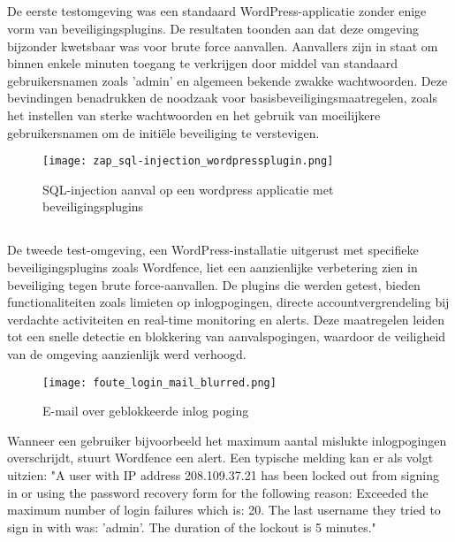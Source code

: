 \subsection{}
De eerste testomgeving was een standaard WordPress-applicatie zonder enige vorm van beveiligingsplugins. De resultaten toonden aan dat deze 
omgeving bijzonder kwetsbaar was voor brute force aanvallen. Aanvallers zijn in staat om binnen enkele minuten toegang te verkrijgen door middel 
van standaard gebruikersnamen zoals 'admin' en algemeen bekende zwakke wachtwoorden. Deze bevindingen benadrukken de noodzaak voor 
basisbeveiligingsmaatregelen, zoals het instellen van sterke wachtwoorden en het gebruik van moeilijkere gebruikersnamen om de initiële 
beveiliging te verstevigen.

\begin{figure}
    \centering
    \texttt{[image: zap\_sql-injection\_wordpressplugin.png]}
    \caption[SQL-injection aanval op een wordpress applicatie met beveiligingsplugins]{SQL-injection aanval op een wordpress applicatie met beveiligingsplugins}
    \label{fig:sql-injection}
\end{figure}
\subsection{}
De tweede test-omgeving, een WordPress-installatie uitgerust met specifieke beveiligingsplugins zoals Wordfence, liet een aanzienlijke 
verbetering zien in beveiliging tegen brute force-aanvallen. De plugins die werden getest, bieden functionaliteiten zoals limieten 
op inlogpogingen, directe accountvergrendeling bij verdachte activiteiten en real-time monitoring en alerts. Deze maatregelen 
leiden tot een snelle detectie en blokkering van aanvalspogingen, waardoor de veiligheid van de omgeving aanzienlijk werd verhoogd.

\begin{figure}
    \centering
    \texttt{[image: foute\_login\_mail\_blurred.png]}
    \caption[E-mail over geblokkeerde inlog poging]{E-mail over geblokkeerde inlog poging}
    \label{fig:geblokkeerde-login}
\end{figure}
Wanneer een gebruiker bijvoorbeeld het maximum aantal mislukte inlogpogingen overschrijdt, stuurt Wordfence een alert. 
Een typische melding kan er als volgt uitzien: "A user with IP address 208.109.37.21 has been locked out from signing in or 
using the password recovery form for the following reason: Exceeded the maximum number of login failures which is: 20. The 
last username they tried to sign in with was: 'admin'. The duration of the lockout is 5 minutes."

